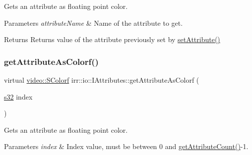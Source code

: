 Gets an attribute as floating point color. 


\begin{DoxyParams}{Parameters}
{\em attribute\+Name} & Name of the attribute to get. \\
\hline
\end{DoxyParams}
\begin{DoxyReturn}{Returns}
Returns value of the attribute previously set by \hyperlink{classirr_1_1io_1_1IAttributes_a03fa31acb481ae23678676cc183f09a6}{set\+Attribute()} 
\end{DoxyReturn}
\mbox{\label{classirr_1_1io_1_1IAttributes_a3400093bf32360c0b2916b94ad0bdbdd}} 
\subsubsection{\texorpdfstring{get\+Attribute\+As\+Colorf()}{getAttributeAsColorf()}\hspace{0.1cm}{\footnotesize\ttfamily [3/4]}}
{\footnotesize\ttfamily virtual \hyperlink{classirr_1_1video_1_1SColorf}{video\+::\+S\+Colorf} irr\+::io\+::\+I\+Attributes\+::get\+Attribute\+As\+Colorf (\begin{DoxyParamCaption}\item[{\hyperlink{namespaceirr_ac66849b7a6ed16e30ebede579f9b47c6}{s32}}]{index }\end{DoxyParamCaption})\hspace{0.3cm}{\ttfamily [pure virtual]}}



Gets an attribute as floating point color. 


\begin{DoxyParams}{Parameters}
{\em index} & Index value, must be between 0 and \hyperlink{classirr_1_1io_1_1IAttributes_a796bdd9440ee7ba0b6742a90a82870b6}{get\+Attribute\+Count()}-\/1. \\
\hline
\end{DoxyParams}
\mbox{\label{classirr_1_1io_1_1IAttributes_a3400093bf32360c0b2916b94ad0bdbdd}} 
